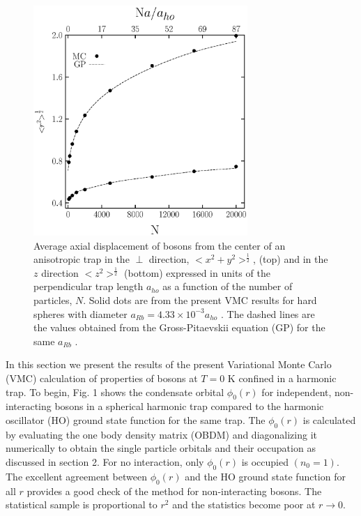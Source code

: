 \documentclass[aps,pra,twocolumn,groupedaddress]{revtex4}
\def\ahop{a_{ho}}
\begin{document}
    \begin{figure}[th!]
\begin{center}
\includegraphics[width=3.2in]{fig3.ps}
 \caption{\footnotesize
    Average axial displacement of bosons from the
    center of an anisotropic trap in the $\perp$ direction, $<\!\!x^2\!\!+\!\!y^2\!\!>^{\frac{1}{2}}$,
    (top) and in the $z$ direction $<\!\!z^2\!\!>^{\frac{1}{2}}$  (bottom) expressed in
    units of the perpendicular trap length $\ahop$
    as a function of the number of particles, $N$.
    Solid dots are from the present VMC results 
    for hard spheres with diameter
    $a_{Rb} = 4.33 \times 10^{-3} \ahop$ .
    The dashed lines are the values obtained from the Gross-Pitaevskii
    equation (GP) for the same $a_{Rb}$ \cite{dalfovo96}. }
\end{center}
    \end{figure}
In this section we present the results of the present
Variational Monte Carlo (VMC) calculation of properties of bosons at $T = 0$ K
confined in a harmonic trap. To begin, Fig. 1 shows the condensate orbital
$\phi_0(r)$ for independent, non-interacting bosons in a spherical harmonic trap
compared to the harmonic oscillator (HO) ground state function for the same
trap. The $\phi_0(r)$ is calculated by evaluating the one body density matrix
(OBDM) and diagonalizing it numerically to obtain the single particle orbitals
and their occupation as discussed in section 2. For no interaction, only
$\phi_0(r)$ is occupied $(n_0 = 1)$. The excellent agreement between $\phi_0(r)$
and the HO ground state function for all $r$ provides a good check of the method
for non-interacting bosons. The statistical sample is proportional to $r^2$ and
the statistics become poor at $r \rightarrow 0$.
\end{document}
